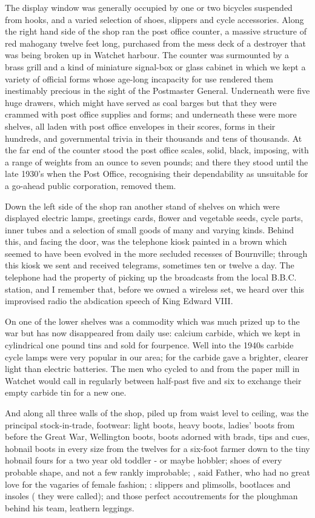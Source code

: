 The display window was generally occupied by one or two bicycles suspended from hooks, and a varied selection of shoes, slippers and cycle accessories. Along the right hand side of the shop ran the post office counter, a massive structure of red mahogany twelve feet long, purchased from the mess deck of a destroyer that was being broken up in Watchet harbour. The counter was surmounted by a brass grill and a kind of miniature signal-box or glass cabinet in which we kept a variety of official forms whose age-long incapacity for use rendered them inestimably precious in the sight of the Postmaster General. Underneath were five huge drawers, which might have served as coal barges but that they were crammed with post office supplies and forms; and underneath these were more shelves, all laden with post office envelopes in their scores, forms in their hundreds, and governmental trivia in their thousands and tens of thousands. At the far end of the counter stood the post office scales, solid, black, imposing, with a range of weights from an ounce to seven pounds; and there they stood until the late 1930’s when the Post Office, recognising their dependability as unsuitable for a go-ahead public corporation, removed them.

Down the left side of the shop ran another stand of shelves on which were displayed electric lamps, greetings cards, flower and vegetable seeds, cycle parts, inner tubes and a selection of small goods of many and varying kinds. Behind this, and facing the door, was the telephone kiosk painted in a brown which seemed to have been evolved in the more secluded recesses of Bournville; through this kiosk we sent and received telegrams, sometimes ten or twelve a day. The telephone had the property of picking up the broadcasts from the local B.B.C. station, and I remember that, before we owned a wireless set, we heard over this improvised radio the abdication speech of King Edward VIII.

On one of the lower shelves was a commodity which was much prized up to the war but has now disappeared from daily use: calcium carbide, which we kept in cylindrical one pound tins and sold for fourpence. Well into the 1940s carbide cycle lamps were very popular in our area; for the carbide gave a brighter, clearer light than electric batteries. The men who cycled to and from the paper mill in Watchet would call in regularly between half-past five and six to exchange their empty carbide tin for a new one.

And along all three walls of the shop, piled up from waist level to ceiling, was the principal stock-in-trade, footwear: light boots, heavy boots, ladies' boots from before the Great War, Wellington boots, boots adorned with brads, tips and cues, hobnail boots in every size from the twelves for a six-foot farmer down to the tiny hobnail fours for a two year old toddler - or maybe hobbler; shoes of every probable shape, and not a few rankly improbable; , said Father, who had no great love for the vagaries of female fashion; : slippers and plimsolls, bootlaces and insoles ( they were called); and those perfect accoutrements for the ploughman behind his team, leathern leggings.

